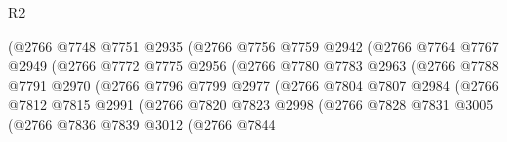 \begin{lexlean}{R2}
\begin{coremodule}
                                  (@2766
                                    @7748
                                    @7751
                                    @2935
                                    (@2766
                                      @7756
                                      @7759
                                      @2942
                                      (@2766
                                        @7764
                                        @7767
                                        @2949
                                        (@2766
                                          @7772
                                          @7775
                                          @2956
                                          (@2766
                                            @7780
                                            @7783
                                            @2963
                                            (@2766
                                              @7788
                                              @7791
                                              @2970
                                              (@2766
                                                @7796
                                                @7799
                                                @2977
                                                (@2766
                                                  @7804
                                                  @7807
                                                  @2984
                                                  (@2766
                                                    @7812
                                                    @7815
                                                    @2991
                                                    (@2766
                                                      @7820
                                                      @7823
                                                      @2998
                                                      (@2766
                                                        @7828
                                                        @7831
                                                        @3005
                                                        (@2766
                                                          @7836
                                                          @7839
                                                          @3012
                                                          (@2766
                                                            @7844

\end{coremodule}
\end{lexlean}
